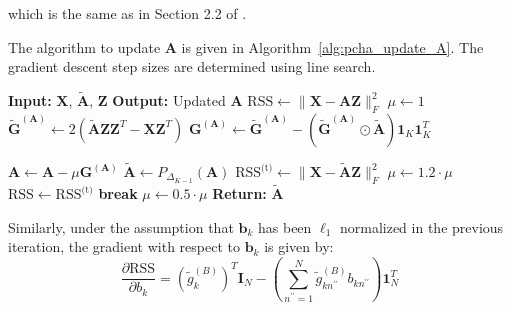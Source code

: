 \documentclass{article}
\begin{document}
which is the same as in Section 2.2 of \autocite{morupArchetypalAnalysisMachine2012}.

The algorithm to update $\mathbf{A}$ is given in Algorithm~\ref{alg:pcha_update_A}. The gradient descent step sizes are determined using line search.

\begin{algorithm}[H]
    \caption{Update $\mathbf{A}$ via Principal Convex Hull Analysis (PCHA)}
    \label{alg:pcha_update_A}
    \begin{algorithmic}[1]
        \State \textbf{Input:} $\mathbf{X}$, $\tilde{\mathbf{A}}$, $\mathbf{Z}$
        \State \textbf{Output:} Updated $\mathbf{A}$
        \State $\text{RSS} \gets \| \mathbf{X} - \mathbf{A} \mathbf{Z} \|_F^2$
        \State $\mu \gets 1$
            \State $\tilde{\mathbf{G}}^{(\mathbf{A})} \gets 2 \left( \tilde{\mathbf{A}} \mathbf{Z} \mathbf{Z}^T - \mathbf{X} \mathbf{Z}^T \right)$
            \State $\mathbf{G}^{(\mathbf{A})} \gets \tilde{\mathbf{G}}^{(\mathbf{A})} - \left(\tilde{\mathbf{G}}^{(\mathbf{A})} \odot \tilde{\mathbf{A}} \right) \mathbf{1}_K \mathbf{1}_K^T$

             
                \State $\mathbf{A} \gets \mathbf{A} - \mu \mathbf{G}^{(\mathbf{A})}$
                \State $\tilde{\mathbf{A}} \gets P_{\Delta_{K-1}}(\mathbf{A})$
                \State $\text{RSS}^{\text{(t)}} \gets \| \mathbf{X} - \tilde{\mathbf{A}} \mathbf{Z} \|_F^2$
                    \State $\mu \gets 1.2 \cdot \mu$
                    \State $\text{RSS} \gets \text{RSS}^{\text{(t)}}$
                    \State \textbf{break}
                \Else
                    \State $\mu \gets 0.5 \cdot \mu$
                \EndIf
                \EndFor
        \EndFor
    \State \textbf{Return:} $\tilde{\mathbf{A}}$
    \end{algorithmic}
\end{algorithm}

Similarly, under the assumption that $\mathbf{b}_k$ has been $\ell_1$ normalized in the previous iteration, the gradient with respect to $\mathbf{b}_k$ is given by:
\begin{equation}
    \frac{\partial \text{RSS}}{\partial b_k} = \left( \tilde{g}^{(B)}_k \right)^T \mathbf{I}_N - \left( \sum_{n^{\prime \prime}=1}^N  \tilde{g}^{(B)}_{k n^{\prime \prime}} b_{kn^{\prime \prime}} \right) \mathbf{1}_N^T
\end{equation}
\end{document}
